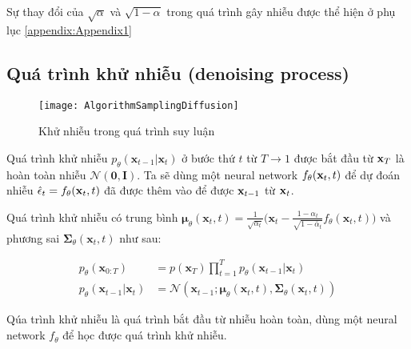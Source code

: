 Sự thay đổi của $\sqrt{\alpha}$ và  $\sqrt{1- \alpha}$ trong quá trình gây nhiễu được thể hiện ở phụ lục \autoref{appendix:Appendix1}

\subsection{Quá trình khử nhiễu (denoising process)}
\label{subsection:denoising_process}

\begin{figure}[H]
	\centering
	\texttt{[image: AlgorithmSamplingDiffusion]}
	\caption{Khử nhiễu trong quá trình suy luận}
	\label{fig:AlgorithmSamplingDiffusion}
	\vspace{-5pt}
\end{figure}

Quá trình khử nhiễu $p_\theta(\mathbf{x}_{t-1} \vert \mathbf{x}_t)$  ở bước thứ $t$ từ $T \to 1$ được bắt đầu từ $\mathbf{x}_T$ là hoàn toàn nhiễu $\mathcal{N} (\mathbf{0}, \mathbf{I})$. Ta sẽ dùng một neural network $f_{\theta} (\mathbf{x}_t, t)$ để dự đoán nhiễu $\hat{\epsilon}_t = f_{\theta}(\mathbf{x}_t, t)$ đã được thêm vào để được $\mathbf{x}_{t-1}$ từ $\mathbf{x}_t$.

Quá trình khử nhiễu có trung bình $\boldsymbol{\mu}_\theta(\mathbf{x}_t, t) = {\frac{1}{\sqrt{\alpha_t}} \Big( \mathbf{x}_t - \frac{1 - \alpha_t}{\sqrt{1 - \bar{\alpha}_t}}  f_\theta(\mathbf{x}_t, t) \Big)}$ và phương sai $\boldsymbol{\Sigma}_\theta(\mathbf{x}_t, t)$ như sau:




\begin{equation}
	\label{eq:denoising_process}
	\begin{aligned}
		p_\theta(\mathbf{x}_{0:T})
		&= p(\mathbf{x}_T) \prod^T_{t=1} p_\theta(\mathbf{x}_{t-1} \vert \mathbf{x}_t) \\
		p_\theta(\mathbf{x}_{t-1} \vert \mathbf{x}_t) &= \mathcal{N}(\mathbf{x}_{t-1};  \boldsymbol{\mu}_\theta(\mathbf{x}_t, t), \boldsymbol{\Sigma}_\theta(\mathbf{x}_t, t))
	\end{aligned}
\end{equation}

Qúa trình khử nhiễu là quá trình bắt đầu từ nhiễu hoàn toàn, dùng một neural network $f_\theta$ để học được quá trình khử nhiễu.

